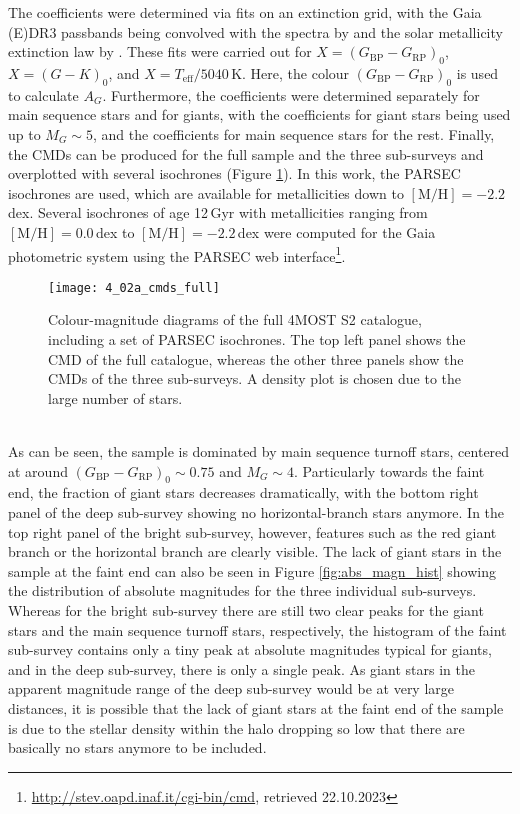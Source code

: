 \documentclass[a4paper,11pt]{article}
\begin{document}
The coefficients were determined via fits on an extinction grid, with the Gaia (E)DR3 passbands \citep{riello21} being convolved with the spectra by \citet{castelli03} and the solar metallicity extinction law by \citet{fitzpatrick19}. These fits were carried out for $X=(G_\mathrm{BP}-G_\mathrm{RP})_0$, $X=(G-K)_0$, and $X=T_\mathrm{eff}/5040$\,K. Here, the colour $(G_\mathrm{BP}-G_\mathrm{RP})_0$ is used to calculate $A_G$. Furthermore, the coefficients were determined separately for main sequence stars and for giants, with the coefficients for giant stars being used up to $M_G\sim5$, and the coefficients for main sequence stars for the rest. Finally, the CMDs can be produced for the full sample and the three sub-surveys and overplotted with several isochrones (Figure \ref{fig:cmds_full}). In this work, the PARSEC isochrones \citep{parsec,marigo17} are used, which are available for metallicities down to $\mathrm{[M/H]}=-2.2$\,dex. Several isochrones of age 12\,Gyr with metallicities ranging from $\mathrm{[M/H]}=0.0$\,dex to $\mathrm{[M/H]}=-2.2$\,dex were computed for the Gaia photometric system using the PARSEC web interface\footnote{\url{http://stev.oapd.inaf.it/cgi-bin/cmd}, retrieved 22.10.2023}.
%
\begin{figure}[h]
 \centering
 \texttt{[image: 4\_02a\_cmds\_full]}
 \caption[CMDs for the full 4MOST S2 target catalogue]{Colour-magnitude diagrams of the full 4MOST S2 catalogue, including a set of PARSEC isochrones. The top left panel shows the CMD of the full catalogue, whereas the other three panels show the CMDs of the three sub-surveys. A density plot is chosen due to the large number of stars.}
 \label{fig:cmds_full}
\end{figure}\\
%
As can be seen, the sample is dominated by main sequence turnoff stars, centered at around $(G_\mathrm{BP}-G_\mathrm{RP})_0\sim0.75$ and $M_G\sim4$. Particularly towards the faint end, the fraction of giant stars decreases dramatically, with the bottom right panel of the deep sub-survey showing no horizontal-branch stars anymore. In the top right panel of the bright sub-survey, however, features such as the red giant branch or the horizontal branch are clearly visible. The lack of giant stars in the sample at the faint end can also be seen in Figure \ref{fig:abs_magn_hist} showing the distribution of absolute magnitudes for the three individual sub-surveys. Whereas for the bright sub-survey there are still two clear peaks for the giant stars and the main sequence turnoff stars, respectively, the histogram of the faint sub-survey contains only a tiny peak at absolute magnitudes typical for giants, and in the deep sub-survey, there is only a single peak. As giant stars in the apparent magnitude range of the deep sub-survey would be at very large distances, it is possible that the lack of giant stars at the faint end of the sample is due to the stellar density within the halo dropping so low that there are basically no stars anymore to be included.
\end{document}

